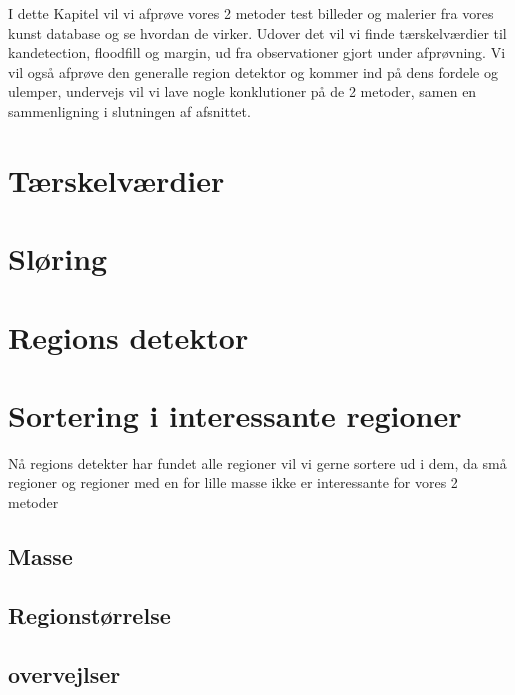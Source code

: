 {
{\sffamily
I dette Kapitel vil vi afprøve vores 2 metoder test billeder og malerier
fra vores kunst database og se hvordan de virker. Udover det vil vi
finde tærskelværdier til kandetection, floodfill og margin, ud fra
observationer gjort under afprøvning. Vi vil også afprøve den generalle
region detektor og kommer ind på dens fordele og ulemper, undervejs vil
vi lave nogle konklutioner på de 2 metoder, samen en sammenligning i
slutningen af afsnittet. }

\section{Tærskelværdier\label{terskelverdi}}

\clearpage

\section{Sløring}

\clearpage

\section{Regions detektor\label{region_detektor}}

\clearpage

\section{Sortering i interessante regioner}
{\sffamily 
Nå regions detekter har fundet alle regioner vil vi gerne sortere ud i
dem, da små regioner og regioner med en for lille masse ikke er
interessante for vores 2 metoder
}
\subsection{Masse}

\clearpage

\subsection{Regionstørrelse \label{region_stoerlse}}

\clearpage

\subsection{overvejlser}



}
